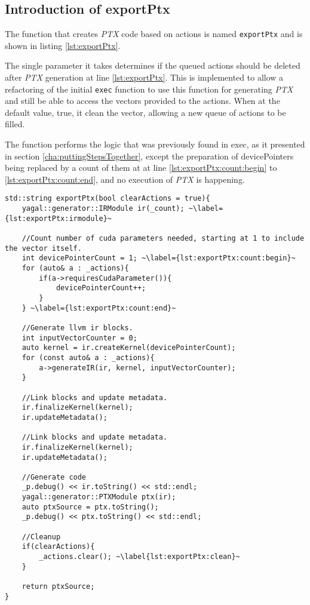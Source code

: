 \subsection{Introduction of exportPtx}
The function that creates \textit{PTX} code based on actions is named \texttt{exportPtx} and is shown in listing \ref{lst:exportPtx}.

The single parameter it takes determines if the queued actions should be deleted after \textit{PTX} generation at line \ref{lst:exportPtx}. This is implemented to allow a refactoring of the initial \texttt{exec} function to use this function for generating \textit{PTX} and still be able to access the vectors provided to the actions. When at the default value, true, it clean the vector, allowing a new queue of actions to be filled.

The function performs the logic that was previously found in exec, as it presented in section \ref{cha:puttingStepsTogether}, except the preparation of devicePointers being replaced by a count of them at at line \ref{lst:exportPtx:count:begin} to \ref{lst:exportPtx:count:end}, and no execution of \textit{PTX} is happening.

\begin{lstlisting}[caption={\texttt{exportPtx} to build \textit{PTX} code.}, label={lst:exportPtx}]
std::string exportPtx(bool clearActions = true){
    yagal::generator::IRModule ir(_count); ~\label={lst:exportPtx:irmodule}~

    //Count number of cuda parameters needed, starting at 1 to include the vector itself.
    int devicePointerCount = 1; ~\label={lst:exportPtx:count:begin}~
    for (auto& a : _actions){
        if(a->requiresCudaParameter()){
            devicePointerCount++;
        }
    } ~\label={lst:exportPtx:count:end}~

    //Generate llvm ir blocks.
    int inputVectorCounter = 0;
    auto kernel = ir.createKernel(devicePointerCount);
    for (const auto& a : _actions){
        a->generateIR(ir, kernel, inputVectorCounter);
    }

    //Link blocks and update metadata.
    ir.finalizeKernel(kernel);
    ir.updateMetadata();

    //Link blocks and update metadata.
    ir.finalizeKernel(kernel);
    ir.updateMetadata();

    //Generate code
    _p.debug() << ir.toString() << std::endl;
    yagal::generator::PTXModule ptx(ir);
    auto ptxSource = ptx.toString();
    _p.debug() << ptx.toString() << std::endl;

    //Cleanup
    if(clearActions){
        _actions.clear(); ~\label{lst:exportPtx:clean}~
    }

    return ptxSource;
}
\end{lstlisting}

